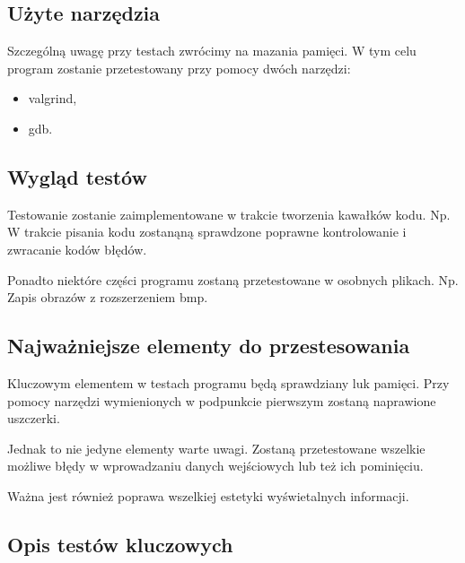 \documentclass[a4paper]{article}
\begin{document}
\subsection{U\.zyte narz\k{e}dzia}
\quad Szczeg\'oln\k{a} uwag\k{e} przy testach zwr\'ocimy na mazania pami\k{e}ci. 
W tym celu program zostanie przetestowany przy pomocy dw\'och narz\k{e}dzi: 

\begin{itemize}
	\item valgrind,
	\item gdb.
\end{itemize}

\subsection{Wygl\k{a}d test\'ow}
\quad Testowanie zostanie zaimplementowane w trakcie tworzenia kawa\l{}k\'ow kodu. 
Np. W trakcie pisania kodu zostan\k{a}n\k{a} sprawdzone poprawne kontrolowanie i zwracanie kod\'ow b\l{}\k{e}d\'ow.


Ponadto niekt\'ore cz\k{e}\'sci programu zostan\k{a} przetestowane w osobnych plikach.
Np. Zapis obraz\'ow z rozszerzeniem bmp.

\subsection{Najwa\.zniejsze elementy do przestesowania}

\quad Kluczowym elementem w testach programu b\k{e}d\k{a} sprawdziany luk pami\k{e}ci. 
Przy pomocy narz\k{e}dzi wymienionych w podpunkcie pierwszym zostan\k{a} naprawione uszczerki.


Jednak to nie jedyne elementy warte uwagi. Zostan\k{a} przetestowane wszelkie mo\.zliwe b\l{}\k{e}dy w wprowadzaniu danych wej\'sciowych lub te\.z ich pomini\k{e}ciu.


Wa\.zna jest r\'ownie\.z poprawa wszelkiej estetyki wy\'swietalnych informacji.

\subsection{Opis test\'ow kluczowych}
\end{document}
